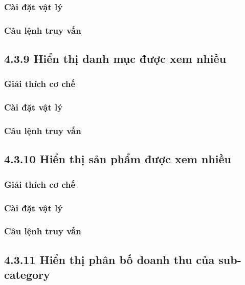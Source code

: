 \subsubsection{Cài đặt vật lý}

\subsubsection{Câu lệnh truy vấn}

\subsection{4.3.9 Hiển thị danh mục được xem nhiều}

\subsubsection{Giải thích cơ chế}

\subsubsection{Cài đặt vật lý}

\subsubsection{Câu lệnh truy vấn}

\subsection{4.3.10 Hiển thị sản phẩm được xem nhiều}

\subsubsection{Giải thích cơ chế}

\subsubsection{Cài đặt vật lý}

\subsubsection{Câu lệnh truy vấn}

\subsection{4.3.11 Hiển thị phân bố doanh thu của sub-category}


